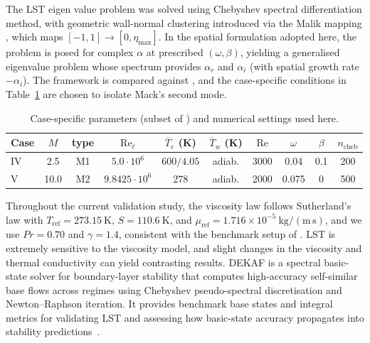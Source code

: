 The \gls{LST} eigen value problem was solved using Chebyshev spectral differentiation method, with geometric wall-normal clustering introduced via the Malik mapping \citep{Malik1990a}, which maps $[-1,1]\to[0,\eta_{\max}]$. In the spatial formulation adopted here, the problem is posed for complex $\alpha$ at prescribed $(\omega,\beta)$, yielding a generalised eigenvalue problem whose spectrum provides $\alpha_r$ and $\alpha_i$ (with spatial growth rate $-\alpha_i$). The framework is compared against \citet{Groot2018}, and the case-specific conditions in Table~\ref{table:lstcomp} are chosen to isolate Mack’s second mode.

\begin{table}[ht]
  \centering
  \caption{Case-specific parameters (subset of \citet{Groot2018}) and numerical settings used here.}
  \label{table:lstcomp}
  \vspace{0.25em}
  \begin{tabular}{@{}lccccccccc@{}}
    \toprule
    Case & $M$ & type & $\mathrm{Re}_\ell$ &
    $\overline{T}_e$ (K) & $\overline{T}_w$ (K) & $\mathrm{Re}$ &
    $\omega$ & $\beta$ & $n_{\mathrm{cheb}}$ \\
    \midrule
    IV & 2.5  & M1 & $5.0\cdot10^{6}$ & $600/4.05$ & adiab. & 3000 & 0.04  & 0.1 & 200 \\
    V  & 10.0 & M2 & $9.8425\cdot10^{6}$ & 278       & adiab. & 2000 & 0.075 & 0   & 500 \\
    \bottomrule
  \end{tabular}
\end{table}


Throughout the current validation study, the viscosity law follows Sutherland’s law with $T_{\mathrm{ref}}=273.15\ \mathrm{K}$, $S=110.6\ \mathrm{K}$, and $\mu_{\mathrm{ref}}=1.716\times10^{-5}\ \mathrm{kg/(m\,s)}$, and we use $Pr=0.70$ and $\gamma=1.4$, consistent with the benchmark setup of \citet{Groot2018}. \gls{LST} is extremely sensitive to the viscosity model, and slight changes in the viscosity and thermal conductivity can yield contrasting results. DEKAF is a spectral basic-state solver for boundary-layer stability that computes high-accuracy self-similar base flows across regimes using Chebyshev pseudo-spectral discretisation and Newton–Raphson iteration. It provides benchmark base states and integral metrics for validating \gls{LST} and assessing how basic-state accuracy propagates into stability predictions~\citep{MiroMiro2019}.


